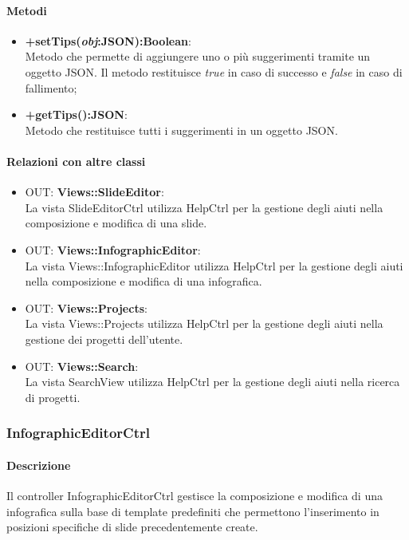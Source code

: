 	\paragraph{Metodi}
	\begin{itemize}
	  \item \textbf{+setTips(\textit{obj}:JSON):Boolean}:\\
		  Metodo che permette di aggiungere uno o più suggerimenti tramite un oggetto JSON. Il metodo restituisce \textit{true} in caso di successo e \textit{false} in caso di fallimento;
	  \item \textbf{+getTips():JSON}:\\
		  Metodo che restituisce tutti i suggerimenti in un oggetto JSON.
	\end{itemize}
	\paragraph{Relazioni con altre classi}
	\begin{itemize}
	 \item OUT: \textbf{Views::SlideEditor}:\\
		La vista SlideEditorCtrl utilizza HelpCtrl per la gestione degli aiuti nella composizione e modifica di una slide.
	 \item OUT: \textbf{Views::InfographicEditor}:\\
		La vista Views::InfographicEditor utilizza HelpCtrl per la gestione degli aiuti nella composizione e modifica di una infografica.
	 \item OUT: \textbf{Views::Projects}:\\
		La vista Views::Projects utilizza HelpCtrl per la gestione degli aiuti nella gestione dei progetti dell'utente.
	 \item OUT: \textbf{Views::Search}:\\
		La vista SearchView utilizza HelpCtrl per la gestione degli aiuti nella ricerca di progetti.
	\end{itemize}

\newpage
\subsubsection{InfographicEditorCtrl}
	\paragraph{Descrizione}
		Il controller InfographicEditorCtrl gestisce la composizione e modifica di una infografica sulla base di template predefiniti che permettono l'inserimento in posizioni specifiche di slide precedentemente create.
	
